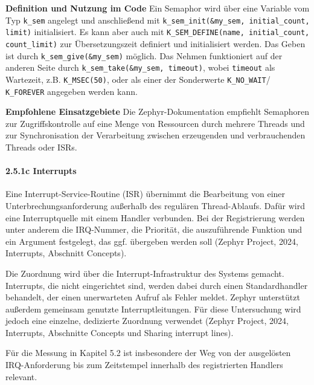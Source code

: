 \textbf{Definition und Nutzung im Code }Ein Semaphor wird {\"u}ber eine Variable vom Typ \lstinline[style=fileinline]|k_sem| angelegt und anschlie{\ss}end mit \lstinline[style=fileinline]|k_sem_init(&my_sem, initial_count, limit)| initialisiert. Es kann aber auch mit \lstinline[style=fileinline]|K_SEM_DEFINE(name, initial_count, count_limit)| zur {\"U}bersetzungszeit definiert und initialisiert werden. Das Geben ist durch \lstinline[style=fileinline]|k_sem_give(&my_sem)| m{\"o}glich. Das Nehmen funktioniert auf der anderen Seite durch \lstinline[style=fileinline]|k_sem_take(&my_sem, timeout)|, wobei \lstinline[style=fileinline]|timeout| als Wartezeit, z.B. \lstinline[style=fileinline]|K_MSEC(50)|, oder als einer der Sonderwerte \lstinline[style=fileinline]|K_NO_WAIT|/ \lstinline[style=fileinline]|K_FOREVER| angegeben werden kann.

\textbf{Empfohlene Einsatzgebiete }Die Zephyr-Dokumentation empfiehlt Semaphoren zur Zugriffskontrolle auf eine Menge von Ressourcen durch mehrere Threads und zur Synchronisation der Verarbeitung zwischen erzeugenden und verbrauchenden Threads oder ISRs.

\paragraph*{\textbf{2.5.1c Interrupts}}
Eine Interrupt-Service-Routine (ISR) {\"u}bernimmt die Bearbeitung von einer Unterbrechungsanforderung au{\ss}erhalb des regul{\"a}ren Thread-Ablaufs. Daf{\"u}r wird eine Interruptquelle mit einem Handler verbunden. Bei der Registrierung werden unter anderem die IRQ-Nummer, die Priorit{\"a}t, die auszuf{\"u}hrende Funktion und ein Argument festgelegt, das ggf. {\"u}bergeben werden soll (Zephyr Project, 2024, \glqq{}Interrupts\grqq{}, Abschnitt \glqq{}Concepts\grqq{}).

Die Zuordnung wird {\"u}ber die Interrupt-Infrastruktur des Systems gemacht. Interrupts, die nicht eingerichtet sind, werden dabei durch einen Standardhandler behandelt, der einen unerwarteten Aufruf als Fehler meldet. Zephyr unterst{\"u}tzt au{\ss}erdem gemeinsam genutzte Interruptleitungen. F{\"u}r diese Untersuchung wird jedoch eine einzelne, dedizierte Zuordnung verwendet (Zephyr Project, 2024, \glqq{}Interrupts\grqq{}, Abschnitte \glqq{}Concepts\grqq{} und \glqq{}Sharing interrupt lines\grqq{}).

F{\"u}r die Messung in Kapitel 5.2 ist insbesondere der Weg von der ausgel{\"o}sten IRQ-Anforderung bis zum Zeitstempel innerhalb des registrierten Handlers relevant.

